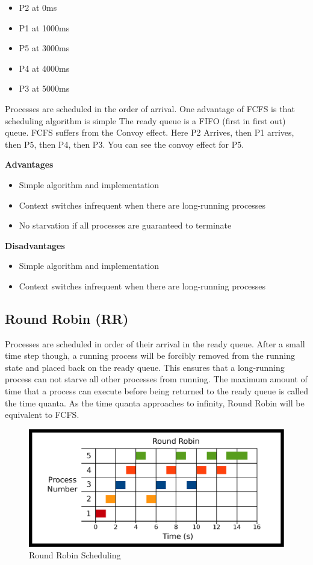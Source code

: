 \begin{itemize}
\tightlist
\item
  P2 at 0ms
\item
  P1 at 1000ms
\item
  P5 at 3000ms
\item
  P4 at 4000ms
\item
  P3 at 5000ms
\end{itemize}

Processes are scheduled in the order of arrival.
One advantage of FCFS is that scheduling algorithm is simple
The ready queue is a FIFO (first in first out) queue.
FCFS suffers from the Convoy effect.
Here P2 Arrives, then P1 arrives, then P5, then P4, then P3.
You can see the convoy effect for P5.

\textbf{Advantages}

\begin{itemize}
\item Simple algorithm and implementation
\item Context switches infrequent when there are long-running processes
\item No starvation if all processes are guaranteed to terminate
\end{itemize}

\textbf{Disadvantages}
\begin{itemize}
\item Simple algorithm and implementation
\item Context switches infrequent when there are long-running processes

\end{itemize}

\subsection{Round Robin (RR)}

Processes are scheduled in order of their arrival in the ready queue.
After a small time step though, a running process will be forcibly removed from the running state and placed back on the ready queue.
This ensures that a long-running process can not starve all other processes from running.
The maximum amount of time that a process can execute before being returned to the ready queue is called the time quanta.
As the time quanta approaches to infinity, Round Robin will be equivalent to FCFS.

\begin{figure}[H]
\centering
\includegraphics[width=\textwidth]{scheduling/drawings/rr.eps}
\caption{Round Robin Scheduling}
\end{figure}

